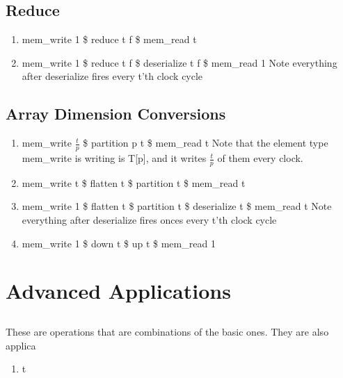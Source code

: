 \documentclass[11pt,fleqn]{article}
\numberwithin{equation}{subsection}
\begin{document}
\subsection{Reduce}
\begin{enumerate}
    \item mem\_write 1 \$ reduce t f \$ mem\_read t
    \item mem\_write 1 \$ reduce t f \$ deserialize t f \$ mem\_read 1
        \subitem Note everything after deserialize fires every t'th clock cycle
\end{enumerate}

\subsection{Array Dimension Conversions}
\begin{enumerate}
    \item mem\_write $\frac{t}{p}$ \$ partition p t \$ mem\_read t
        \subitem Note that the element type mem\_write is writing is T[p],
        and it writes $\frac{t}{p}$ of them every clock.
    \item mem\_write t \$ flatten t \$ partition t \$ mem\_read t
    \item mem\_write 1 \$ flatten t \$ partition t \$ deserialize t \$ mem\_read t
        \subitem Note everything after deserialize fires onces every t'th clock 
        cycle
    \item mem\_write 1 \$ down t \$ up t \$ mem\_read 1
\end{enumerate}

\section{Advanced Applications}

\subsection{}
These are operations that are combinations of the basic ones. They are also
applica
\begin{enumerate}
    \item t
\end{enumerate}
\end{document}
